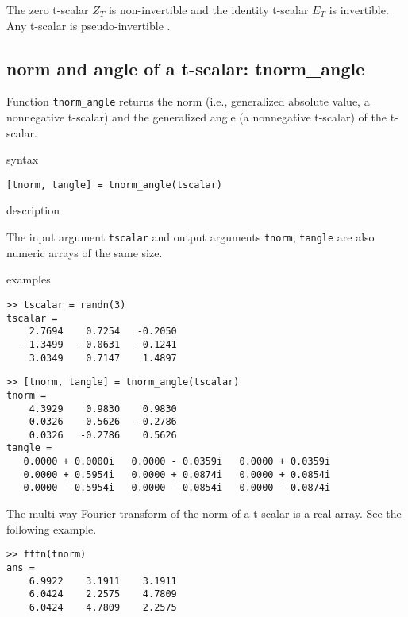 \documentclass[12pt,reqno]{amsart}
\numberwithin{equation}{section}
\numberwithin{figure}{section}
\numberwithin{table}{section}
\theoremstyle{definition}
\begin{document}
The zero t-scalar $Z_{T}$ is non-invertible and the identity t-scalar $E_T$ is invertible. Any t-scalar is pseudo-invertible \cite{liao2020general,liao2020generalized}.  




\subsection{{\color{blue} \sc norm and angle of a t-scalar}: {\color{blue}tnorm\_angle}}
Function {\tt tnorm\_angle} returns the norm (i.e., generalized absolute value, a nonnegative t-scalar) and 
the generalized angle (a nonnegative t-scalar) of the t-scalar.  

\noindent 
{\color{red} \sc syntax}

{\tt  [tnorm, tangle] = tnorm\_angle(tscalar) }

\noindent
{\color{red} \sc description}

The input argument {\tt tscalar} and output arguments {\tt tnorm},  {\tt tangle} are also numeric arrays of the same size.  


\noindent
{\color{red} \sc examples}
\begin{verbatim}
>> tscalar = randn(3)
tscalar =
    2.7694    0.7254   -0.2050
   -1.3499   -0.0631   -0.1241
    3.0349    0.7147    1.4897
\end{verbatim}

\begin{verbatim}
>> [tnorm, tangle] = tnorm_angle(tscalar)
tnorm =
    4.3929    0.9830    0.9830
    0.0326    0.5626   -0.2786
    0.0326   -0.2786    0.5626
tangle =
   0.0000 + 0.0000i   0.0000 - 0.0359i   0.0000 + 0.0359i
   0.0000 + 0.5954i   0.0000 + 0.0874i   0.0000 + 0.0854i
   0.0000 - 0.5954i   0.0000 - 0.0854i   0.0000 - 0.0874i
\end{verbatim}


\vspace{1em}
The multi-way Fourier transform of the norm of a t-scalar is a real array. See the following example. 

\begin{verbatim}
>> fftn(tnorm)
ans =
    6.9922    3.1911    3.1911
    6.0424    2.2575    4.7809
    6.0424    4.7809    2.2575
\end{verbatim}




\end{document}
